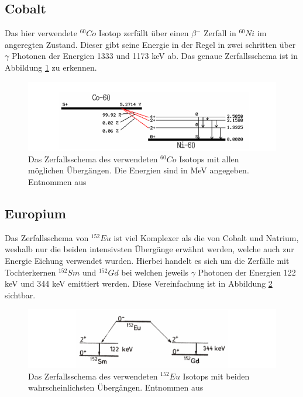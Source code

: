\subsection{Cobalt}
Das hier verwendete $^{60}Co$ Isotop zerfällt über einen $\beta^-$ Zerfall in $^{60}Ni$ im angeregten Zustand. Dieser gibt seine Energie in der Regel in zwei schritten über $\gamma$ Photonen der Energien 1333 und 1173 keV ab. Das genaue Zerfallsschema ist in Abbildung \ref{Cobalt_schema} zu erkennen.
\begin{figure}
	\centering
	\includegraphics[scale=0.8]{Bilder/Cobalt_zerfall}
	\caption[Zerfallsschema Cobalt]{\small Das Zerfallsschema des verwendeten $^{60}Co$ Isotops mit allen möglichen Übergängen. Die Energien sind in MeV angegeben. Entnommen aus \cite{staatsex_szinti}}
	\label{Cobalt_schema}
\end{figure}

\subsection{Europium}
Das Zerfallsschema von $^{152}Eu$ ist viel Komplexer als die von Cobalt und Natrium, weshalb nur die beiden intensivsten Übergänge erwähnt werden, welche auch zur Energie Eichung verwendet wurden. Hierbei handelt es sich um die Zerfälle mit Tochterkernen $^{152}Sm$ und  $^{152}Gd$ bei welchen jeweils $\gamma$ Photonen der Energien 122 keV und 344 keV emittiert werden. Diese Vereinfachung ist in Abbildung \ref{Europium_schema}   sichtbar.
\begin{figure}
	\centering
	\includegraphics[scale=0.8]{Bilder/Europium_zerfall}
	\caption[Zerfallsschema Europium]{\small Das Zerfallsschema des verwendeten $^{152}Eu$ Isotops mit beiden wahrscheinlichsten Übergängen. Entnommen aus \cite{staatsex_szinti}}
	\label{Europium_schema}
\end{figure}


